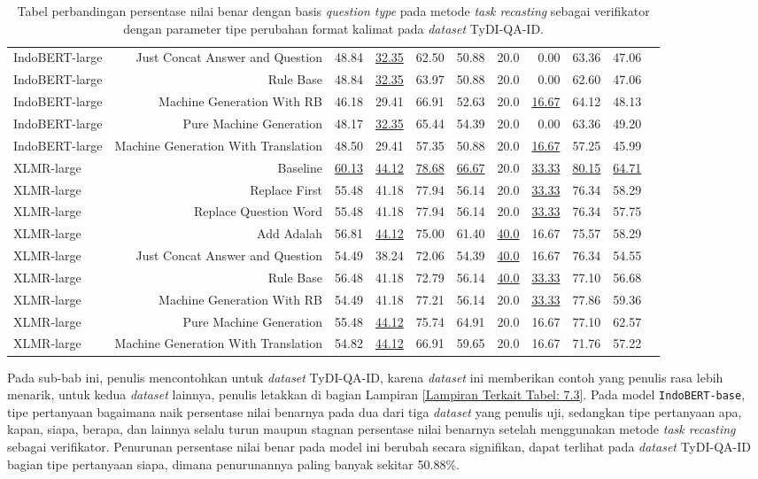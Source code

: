 \begin{table}[H]
\begin{tabular}{lrrrrrrrrrr}
IndoBERT-large &Just Concat Answer and Question &48.84 &\underline{32.35} &62.50 &50.88 &20.0 &0.00 &63.36 &47.06 \\
IndoBERT-large &Rule Base &48.84 &\underline{32.35} &63.97 &50.88 &20.0 &0.00 &62.60 &47.06 \\
IndoBERT-large &Machine Generation With RB &46.18 &29.41 &66.91 &52.63 &20.0 &\underline{16.67} &64.12 &48.13 \\
IndoBERT-large &Pure Machine Generation &48.17 &\underline{32.35} &65.44 &54.39 &20.0 &0.00 &63.36 &49.20 \\
IndoBERT-large &Machine Generation With Translation &48.50 &29.41 &57.35 &50.88 &20.0 &\underline{16.67} &57.25 &45.99 \\
\hline
XLMR-large &Baseline &\underline{60.13} &\underline{44.12} &\underline{78.68} &\underline{66.67} &20.0 &\underline{33.33} &\underline{80.15} &\underline{64.71} \\
XLMR-large &Replace First &55.48 &41.18 &77.94 &56.14 &20.0 &\underline{33.33} &76.34 &58.29 \\
XLMR-large &Replace Question Word &55.48 &41.18 &77.94 &56.14 &20.0 &\underline{33.33} &76.34 &57.75 \\
XLMR-large &Add Adalah &56.81 &\underline{44.12} &75.00 &61.40 &\underline{40.0} &16.67 &75.57 &58.29 \\
XLMR-large &Just Concat Answer and Question &54.49 &38.24 &72.06 &54.39 &\underline{40.0} &16.67 &76.34 &54.55 \\
XLMR-large &Rule Base &56.48 &41.18 &72.79 &56.14 &\underline{40.0} &\underline{33.33} &77.10 &56.68 \\
XLMR-large &Machine Generation With RB &54.49 &41.18 &77.21 &56.14 &20.0 &\underline{33.33} &77.86 &59.36 \\
XLMR-large &Pure Machine Generation &55.48 &\underline{44.12} &75.74 &64.91 &20.0 &16.67 &77.10 &62.57 \\
XLMR-large &Machine Generation With Translation &54.82 &\underline{44.12} &66.91 &59.65 &20.0 &16.67 &71.76 &57.22 \\
\bottomrule
\end{tabular}
\caption{Tabel perbandingan persentase nilai benar dengan basis \emph{question type} pada metode \emph{task recasting} sebagai verifikator dengan parameter tipe perubahan format kalimat pada \emph{dataset} TyDI-QA-ID.}
\end{table}

Pada sub-bab ini, penulis mencontohkan untuk \emph{dataset} TyDI-QA-ID, karena \emph{dataset} ini memberikan contoh yang penulis rasa lebih menarik, untuk kedua \emph{dataset} lainnya, penulis letakkan di bagian Lampiran \ref{Lampiran Terkait Tabel: 7.3}. Pada model \texttt{IndoBERT-base}, tipe pertanyaan bagaimana naik persentase nilai benarnya pada dua dari tiga \emph{dataset} yang penulis uji, sedangkan tipe pertanyaan apa, kapan, siapa, berapa, dan lainnya selalu turun maupun stagnan persentase nilai benarnya setelah menggunakan metode \emph{task recasting} sebagai verifikator. Penurunan persentase nilai benar pada model ini berubah secara signifikan, dapat terlihat pada \emph{dataset} TyDI-QA-ID bagian tipe pertanyaan siapa, dimana penurunannya paling banyak sekitar 50.88\%.


